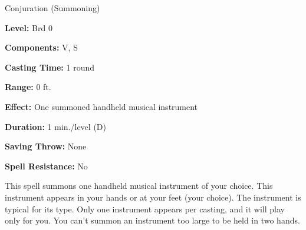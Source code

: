 
Conjuration (Summoning)

\textbf{Level:} Brd 0

\textbf{Components:} V, S

\textbf{Casting Time:} 1 round

\textbf{Range:} 0 ft.

\textbf{Effect:} One summoned handheld musical instrument

\textbf{Duration:} 1 min./level (D)

\textbf{Saving Throw:} None

\textbf{Spell Resistance:} No

This spell summons one handheld musical instrument of your choice. This instrument 
appears in your hands or at your feet (your choice). The instrument is typical 
for its type. Only one instrument appears per casting, and it will play only for 
you. You can't summon an instrument too large to be held in two hands.


